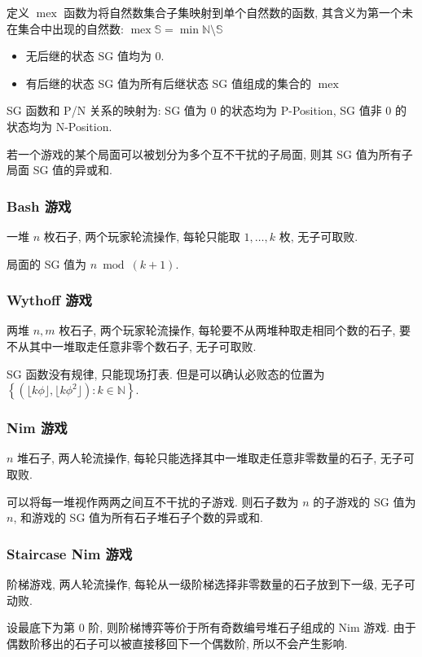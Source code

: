 定义 $\operatorname{mex}$ 函数为将自然数集合子集映射到单个自然数的函数, 其含义为第一个未在集合中出现的自然数: $\operatorname{mex}\mathbb S=\min\mathbb N\setminus\mathbb S$

\begin{itemize}
  \item 无后继的状态 SG 值均为 0.
  \item 有后继的状态 SG 值为所有后继状态 SG 值组成的集合的 $\operatorname{mex}$
\end{itemize}

SG 函数和 P/N 关系的映射为: SG 值为 0 的状态均为 P-Position, SG 值非 0 的状态均为 N-Position.

若一个游戏的某个局面可以被划分为多个互不干扰的子局面, 则其 SG 值为所有子局面 SG 值的异或和.

\subsubsection{Bash 游戏}
一堆 $n$ 枚石子, 两个玩家轮流操作, 每轮只能取 $1,\dots,k$ 枚, 无子可取败.

局面的 SG 值为 $n\bmod (k+1)$.

\subsubsection{Wythoff 游戏}
两堆 $n,m$ 枚石子, 两个玩家轮流操作, 每轮要不从两堆种取走相同个数的石子, 要不从其中一堆取走任意非零个数石子, 无子可取败.

SG 函数没有规律, 只能现场打表. 但是可以确认必败态的位置为 $\left\{\left(\lfloor k\phi\rfloor,\lfloor k\phi^2\rfloor\right):k\in\mathbb N\right\}$.

\subsubsection{Nim 游戏}
$n$ 堆石子, 两人轮流操作, 每轮只能选择其中一堆取走任意非零数量的石子, 无子可取败.

可以将每一堆视作两两之间互不干扰的子游戏. 则石子数为 $n$ 的子游戏的 SG 值为 $n$, 和游戏的 SG 值为所有石子堆石子个数的异或和.

\subsubsection{Staircase Nim 游戏}
阶梯游戏, 两人轮流操作, 每轮从一级阶梯选择非零数量的石子放到下一级, 无子可动败.

设最底下为第 0 阶, 则阶梯博弈等价于所有奇数编号堆石子组成的 Nim 游戏. 由于偶数阶移出的石子可以被直接移回下一个偶数阶, 所以不会产生影响.

